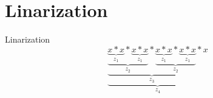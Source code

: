 \documentclass[]{beamer}
\begin{document}
\section{Linarization}
\begin{frame}{Linarization}
    $$\underbrace{ \underbrace{ \underbrace{ \underbrace{ x \ast x }\limits_{z_{1}} \ast \underbrace{ x \ast x }\limits_{z_{1}}}\limits_{z_{2}} \ast \underbrace{ \underbrace{ x \ast x }\limits_{z_{1}} \ast \underbrace{ x \ast x }\limits_{z_{1}}}\limits_{z_{2}}}\limits_{z_{3}} \ast x}\limits_{z_{4}}$$
\end{frame}

\end{document}
